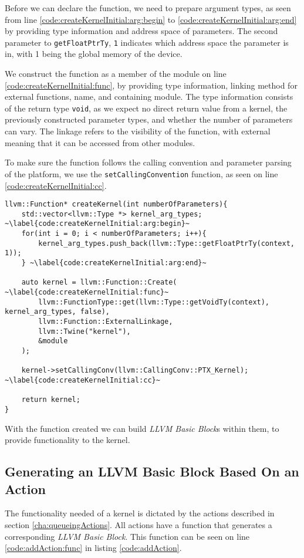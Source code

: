 Before we can declare the function, we need to prepare argument types, as seen from line \ref{code:createKernelInitial:arg:begin} to \ref{code:createKernelInitial:arg:end} by providing type information and address space of parameters. The second parameter to \texttt{getFloatPtrTy}, \texttt{1} indicates which address space the parameter is in, with 1 being the global memory of the device.

We construct the function as a member of the module on line \ref{code:createKernelInitial:func}, by providing type information, linking method for external functions, name, and containing module. The type information consists of the return type \texttt{void}, as we expect no direct return value from a kernel, the previously constructed parameter types, and whether the number of parameters can vary. The linkage refers to the visibility of the function, with external meaning that it can be accessed from other modules.

To make sure the function follows the calling convention and parameter parsing of the platform, we use the \texttt{setCallingConvention} function, as seen on line \ref{code:createKernelInitial:cc}. 

\begin{lstlisting}[caption={The createKernel function.}, label={code:createKernelInitial}]
llvm::Function* createKernel(int numberOfParameters){
    std::vector<llvm::Type *> kernel_arg_types; ~\label{code:createKernelInitial:arg:begin}~
    for(int i = 0; i < numberOfParameters; i++){
        kernel_arg_types.push_back(llvm::Type::getFloatPtrTy(context, 1));
    } ~\label{code:createKernelInitial:arg:end}~

    auto kernel = llvm::Function::Create( ~\label{code:createKernelInitial:func}~
        llvm::FunctionType::get(llvm::Type::getVoidTy(context), kernel_arg_types, false),
        llvm::Function::ExternalLinkage,
        llvm::Twine("kernel"),
        &module
    );

    kernel->setCallingConv(llvm::CallingConv::PTX_Kernel); ~\label{code:createKernelInitial:cc}~

    return kernel;
}
\end{lstlisting}

With the function created we can build \textit{LLVM Basic Block}s within them, to provide functionality to the kernel.

\subsection{Generating an LLVM Basic Block Based On an Action} \label{sec:bbbuilding}
The functionality needed of a kernel is dictated by the actions described in section \ref{cha:queueingActions}. All actions have a function that generates a corresponding \textit{LLVM Basic Block}. This function can be seen on line \ref{code:addAction:func} in listing \ref{code:addAction}.

